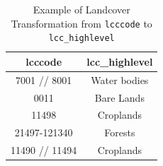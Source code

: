 \begin{table}[H]
    \centering
    \caption{Example of Landcover Transformation from \texttt{lcccode} to \texttt{lcc\_highlevel}}
    \label{tab:landcover_highlevel}
    \begin{tabular}{cc}
        \toprule
        \textbf{lcccode} & \textbf{lcc\_highlevel} \\
        \midrule
        7001 // 8001      & Water bodies \\
        0011      & Bare Lands \\
        11498     & Croplands \\
        21497-121340      & Forests \\
        11490 // 11494      & Croplands \\
        \bottomrule
    \end{tabular}
\end{table}
